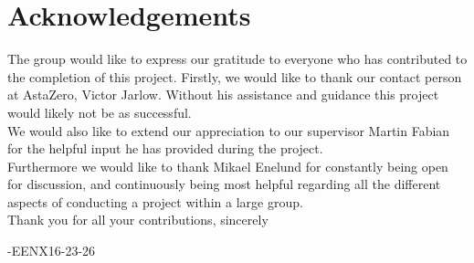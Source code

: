 \thispagestyle{plain}			%
\section*{Acknowledgements}
The group would like to express our gratitude to everyone who has contributed to the completion of this project. Firstly, we would like to thank our contact person at AstaZero, Victor Jarlow. Without his assistance and guidance this project would likely not be as successful.
\\

We would also like to extend our appreciation to our supervisor Martin Fabian for the helpful input he has provided during the project. 
\\

Furthermore we would like to thank Mikael Enelund for constantly being open for discussion, and continuously being most helpful regarding all the different aspects of conducting a project within a large group. 
\\

Thank you for all your contributions, sincerely

\vspace{1.5cm}
\hfill
-EENX16-23-26

\newpage				%
\thispagestyle{empty}
\mbox{}